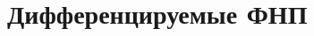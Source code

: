 \documentclass[../main.tex]{subfiles}
\begin{document}
 \chapter{Дифференцируемые ФНП}
 
\end{document}
